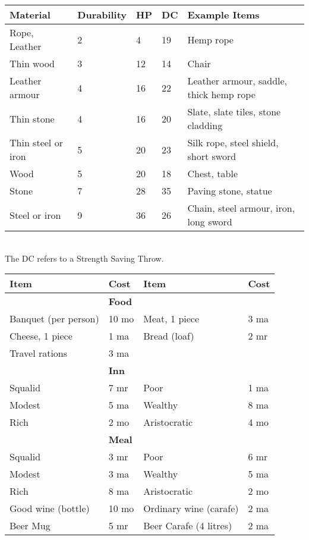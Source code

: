 \documentclass[landscape,10pt,a4paper]{article}
\begin{document}
\begin{multicols}{2}


\begin{dmbox}[title=Split - page \pageref{objecthardness}]

\noindent\begin{tabularx}{1\linewidth}{llllX}
\textbf{Material} &\textbf{Durability}&\textbf{HP} & \textbf{DC} & \textbf{Example Items}\\
\toprule{}
Rope, Leather&2&4&19&Hemp rope\\
Thin wood&3&12&14&Chair\\
Leather armour &4&16&22&Leather armour, saddle, thick hemp rope\\
Thin stone&4&16&20&Slate, slate tiles, stone cladding\\
Thin steel or iron&5&20&23&Silk rope, steel shield, short sword\\
Wood&5&20&18&Chest, table\\
Stone&7&28&35&Paving stone, statue\\
Steel or iron&9&36&26&Chain, steel armour, iron, long sword\\
\end{tabularx}\\

The DC refers to a Strength Saving Throw.

\end{dmbox}




\begin{dmbox}[title=Items and Supplies - page \pageref{equipmentlist}]

\noindent\begin{tabular}{ll|ll}
\textbf{Item}&\textbf{Cost}&\textbf{Item}&\textbf{Cost}\\
\hline
&\textbf{Food} &&\\
Banquet (per person)&10 mo&Meat, 1 piece&3 ma\\
Cheese, 1 piece&1 ma&Bread (loaf)&2 mr\\
Travel rations& 3 ma &&\\
\hline
&\textbf{Inn}&&\\
Squalid&7 mr&Poor&1 ma\\
Modest&5 ma&Wealthy&8 ma\\
Rich&2 mo&Aristocratic&4 mo\\
\hline
&\textbf{Meal}&&\\
Squalid&3 mr&Poor&6 mr\\
Modest&3 ma&Wealthy&5 ma\\
Rich&8 ma&Aristocratic&2 mo\\
Good wine (bottle)&10 mo& Ordinary wine (carafe)&2 ma\\
Beer Mug&5 mr&Beer Carafe (4 litres)&2 ma\\
\end{tabular}
\end{dmbox}





\end{multicols}
\end{document}
